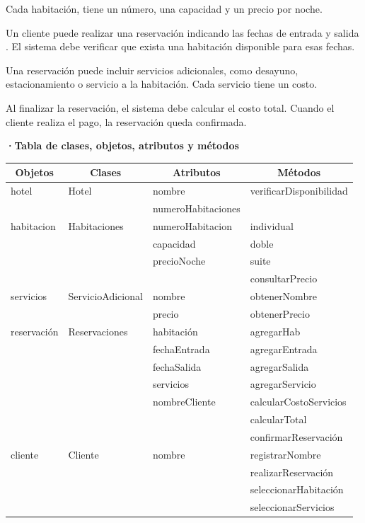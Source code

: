 \documentclass[12pt]{article}
\begin{document}
Cada habitación, tiene un número, una capacidad y un precio por noche.

Un cliente puede realizar una reservación indicando las fechas de entrada y salida . El sistema debe verificar que exista una habitación disponible para esas fechas.

Una reservación puede incluir servicios adicionales, como desayuno, estacionamiento o servicio a la habitación. Cada servicio tiene un costo.

Al finalizar la reservación, el sistema debe calcular el costo total. Cuando el cliente realiza el pago, la reservación queda confirmada.


\textbf{·Tabla de clases, objetos, atributos y métodos}

\begin{table}[H]
\begin{tabular}{|l|l|l|l|}
\hline
\multicolumn{1}{|c|}{\textbf{Objetos}} & \multicolumn{1}{c|}{\textbf{Clases}} & \multicolumn{1}{c|}{\textbf{Atributos}} & \multicolumn{1}{c|}{\textbf{Métodos}} \\
\hline 
hotel & Hotel & nombre & verificarDisponibilidad \\ 
 & & numeroHabitaciones & \\ \hline
habitacion & Habitaciones & numeroHabitacion & individual \\
 & & capacidad & doble \\
 & & precioNoche & suite \\
 & & & consultarPrecio\\ \hline
servicios & ServicioAdicional & nombre & obtenerNombre \\
 & & precio & obtenerPrecio \\ \hline
reservación & Reservaciones & habitación & agregarHab \\
 & & fechaEntrada & agregarEntrada \\
 & & fechaSalida & agregarSalida \\ 
 & & servicios & agregarServicio \\
 & & nombreCliente & calcularCostoServicios \\
 & & & calcularTotal \\
 & & & confirmarReservación \\ \hline 
cliente & Cliente & nombre & registrarNombre \\
 & & & realizarReservación \\
 & & & seleccionarHabitación \\
 & & & seleccionarServicios \\

\end{tabular}
\end{table}
\end{document}
